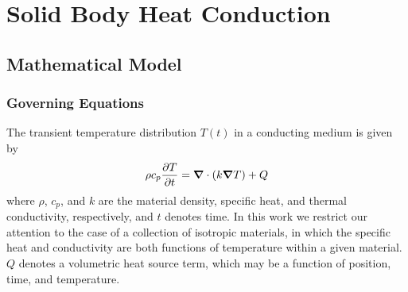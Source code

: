 \chapter{Solid Body Heat Conduction}

\section{Mathematical Model}
\subsection{Governing Equations}
The transient temperature distribution $T\left(t\right)$ in a conducting medium is given by~\cite{cfmht}
\begin{equation}
  \rho c_p {\frac{\partial{T}}{\partial{t}}} = {\boldsymbol{\nabla}} {}\cdot\left(k {\boldsymbol{\nabla}} {T}\right) + Q
  \label{eq:pde_thermal}
\end{equation}
where $\rho$, $c_p$, and $k$ are the material density, specific heat, and thermal conductivity, respectively, and $t$ denotes time.  In this work we restrict our attention to the case of a collection of isotropic materials, in which the specific heat and conductivity are both functions of temperature within a given material.  $Q$ denotes a volumetric heat source term, which may be a function of position, time, and temperature.




